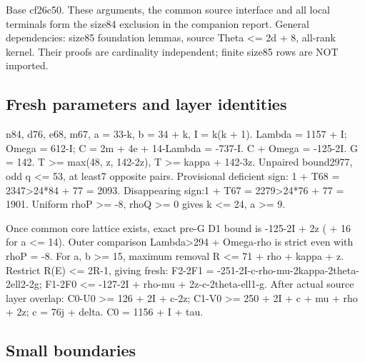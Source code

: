 \documentclass[11pt,a4paper]{article}
\begin{document}
Base cf26c50. These arguments, the common source interface and all local
terminals form the size84 exclusion in the companion report. General
dependencies: size85 foundation lemmas, source Theta \textless= 2d + 8,
all-rank kernel. Their proofs are cardinality independent; finite size85
rows are NOT imported.

\hypertarget{fresh-parameters-and-layer-identities}{%
\subsection{Fresh parameters and layer
identities}\label{fresh-parameters-and-layer-identities}}

n84, d76, e68, m67, a = 33-k, b = 34 + k, I = k(k + 1). Lambda = 1157 +
I; Omega = 612-I; C = 2m + 4e + 14-Lambda = -737-I. C + Omega = -125-2I.
G = 142. T \textgreater= max(48, z, 142-2z), T \textgreater= kappa +
142-3z. Unpaired bound2977, odd q \textless= 53, at least7 opposite
pairs. Provisional deficient sign: 1 + T68 = 2347\textgreater24*84 + 77
= 2093. Disappearing sign:1 + T67 = 2279\textgreater24*76 + 77 = 1901.
Uniform rhoP \textgreater= -8, rhoQ \textgreater= 0 gives k \textless=
24, a \textgreater= 9.

Once common core lattice exists, exact pre-G D1 bound is -125-2I + 2z (
+ 16 for a \textless= 14). Outer comparison Lambda\textgreater294 +
Omega-rho is strict even with rhoP = -8. For a, b \textgreater= 15,
maximum removal R \textless= 71 + rho + kappa + z. Restrict R(E)
\textless= 2R-1, giving fresh: F2-2F1 =
-251-2I-c-rho-mu-2kappa-2theta-2ell2-2g; F1-2F0 \textless= -127-2I +
rho-mu + 2z-c-2theta-ell1-g. After actual source layer overlap: C0-U0
\textgreater= 126 + 2I + c-2z; C1-V0 \textgreater= 250 + 2I + c + mu +
rho + 2z; c = 76j + delta. C0 = 1156 + I + tau.

\hypertarget{small-boundaries}{%
\subsection{Small boundaries}\label{small-boundaries}}
\end{document}
